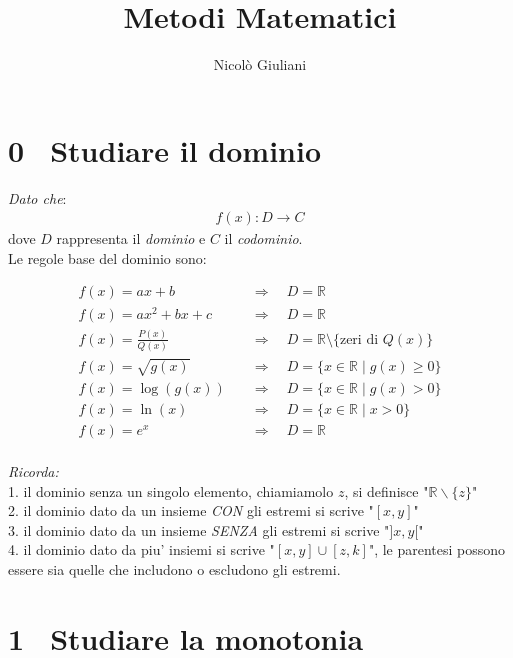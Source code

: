 \documentclass{article}
\title{Metodi Matematici}
\author{Nicolò Giuliani}
\date{}
\begin{document}
\maketitle


\section*{0 \, Studiare il dominio}

\textit{Dato che}: \\
\begin{align*}
    f(x) : D \to C
\end{align*}
dove $D$ rappresenta il \textit{dominio} e $C$ il \textit{codominio}.\\

Le regole base del dominio sono:

\begin{align*}
    f(x) = ax + b &\quad \Rightarrow \quad D = \mathbb{R} \\
    f(x) = ax^2 + bx + c &\quad \Rightarrow \quad D = \mathbb{R} \\
    f(x) = \frac{P(x)}{Q(x)} &\quad \Rightarrow \quad D = \mathbb{R} \setminus \{\text{zeri di } Q(x)\} \\
    f(x) = \sqrt{g(x)} &\quad \Rightarrow \quad D = \{x \in \mathbb{R} \mid g(x) \geq 0\} \\
    f(x) = \log(g(x)) &\quad \Rightarrow \quad D = \{x \in \mathbb{R} \mid g(x) > 0\} \\
    f(x) = \ln(x) &\quad \Rightarrow \quad D = \{x \in \mathbb{R} \mid x > 0\} \\
    f(x) = e^x &\quad \Rightarrow \quad D = \mathbb{R} \\
\end{align*}

\textit{Ricorda:} \\
1. il dominio senza un singolo elemento, chiamiamolo $z$, si definisce "$\mathbb{R}\backslash \{z\}$" \\
2. il dominio dato da un insieme \textit{CON} gli estremi si scrive "$[x,y]$" \\
3. il dominio dato da un insieme \textit{SENZA} gli estremi si scrive "$]x, y[$" \\
4. il dominio dato da piu' insiemi si scrive "$[x,y] \cup  [z,k]$", le parentesi possono essere sia quelle che includono o escludono gli estremi.

\pagebreak
\section*{1 \, Studiare la monotonia}
\end{document}

